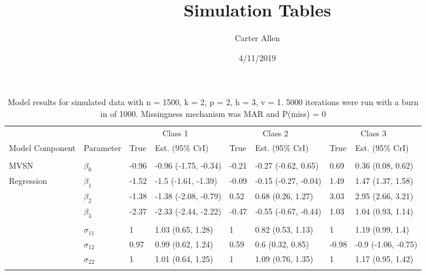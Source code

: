 \documentclass[]{article}
\title{Simulation Tables}
\author{Carter Allen}
\date{4/11/2019}
\begin{document}
\maketitle

\begin{table}[t]

\caption{\label{tab:unnamed-chunk-4}Model results for simulated data with n = 1500, k = 2, p = 2, h = 3, v = 1. 5000 iterations were run with a burn in of 1000. Missingness mechanism was MAR and P(miss) = 0}
\centering
\fontsize{8}{10}\selectfont
\begin{tabular}{llllllll}
\toprule
\multicolumn{2}{c}{ } & \multicolumn{2}{c}{Class 1} & \multicolumn{2}{c}{Class 2} & \multicolumn{2}{c}{Class 3} \\
\cmidrule(l{3pt}r{3pt}){3-4} \cmidrule(l{3pt}r{3pt}){5-6} \cmidrule(l{3pt}r{3pt}){7-8}
Model Component & Parameter & True & Est. (95\% CrI) & True & Est. (95\% CrI) & True & Est. (95\% CrI)\\
\midrule
\addlinespace[0.3em]
\multicolumn{8}{l}{\textbf{ }}\\
\hspace{1em}MVSN & $\beta_{0}$ & -0.96 & -0.96 (-1.75, -0.34) & -0.21 & -0.27 (-0.62, 0.65) & 0.69 & 0.36 (0.08, 0.62)\\
\hspace{1em}Regression & $\beta_{1}$ & -1.52 & -1.5 (-1.61, -1.39) & -0.09 & -0.15 (-0.27, -0.04) & 1.49 & 1.47 (1.37, 1.58)\\
\hspace{1em} & $\beta_{2}$ & -1.38 & -1.38 (-2.08, -0.79) & 0.52 & 0.68 (0.26, 1.27) & 3.03 & 2.95 (2.66, 3.21)\\
\hspace{1em} & $\beta_{3}$ & -2.37 & -2.33 (-2.44, -2.22) & -0.47 & -0.55 (-0.67, -0.44) & 1.03 & 1.04 (0.93, 1.14)\\
\addlinespace[0.3em]
\multicolumn{8}{l}{\textbf{ }}\\
\hspace{1em} & $\sigma_{11}$ & 1 & 1.03 (0.65, 1.28) & 1 & 0.82 (0.53, 1.13) & 1 & 1.19 (0.99, 1.4)\\
\hspace{1em} & $\sigma_{12}$ & 0.97 & 0.99 (0.62, 1.24) & 0.59 & 0.6 (0.32, 0.85) & -0.98 & -0.9 (-1.06, -0.75)\\
\hspace{1em} & $\sigma_{22}$ & 1 & 1.01 (0.64, 1.25) & 1 & 1.09 (0.76, 1.35) & 1 & 1.17 (0.95, 1.42)\\
\addlinespace[0.3em]
\multicolumn{8}{l}{\textbf{ }}\\

\end{tabular}
\end{table}
\end{document}
